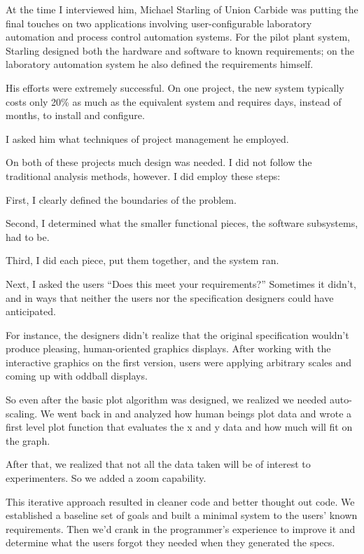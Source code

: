 \begin{interview}
\noindent At the time I interviewed him, Michael Starling of Union
Carbide was putting the final touches on two applications involving
user-configurable laboratory automation and process control automation
systems. For the pilot plant system, Starling designed both the
hardware and software to known requirements; on the laboratory
automation system he also defined the requirements himself.

His efforts were extremely successful. On one project, the new system
typically costs only 20\% as much as the equivalent system and
requires days, instead of months, to install and configure.

I asked him what techniques of project management he employed.

\begin{tfquot}
On both of these projects much design was needed. I did not follow the
traditional analysis methods, however. I did employ these steps:

First, I clearly defined the boundaries of the problem.

Second, I determined what the smaller functional pieces, the software
subsystems, had to be.

Third, I did each piece, put them together, and the system ran.

Next, I asked the users ``Does this meet your requirements?''
Sometimes it didn't, and in ways that neither the users nor the
specification designers could have anticipated.

For instance, the designers didn't realize that the original
specification wouldn't produce pleasing, human-oriented graphics
displays. After working with the interactive graphics on the first
version, users were applying arbitrary scales and coming up with
oddball displays.

So even after the basic plot algorithm was designed, we realized we
needed auto-scaling. We went back in and analyzed how human beings
plot data and wrote a first level plot function that evaluates the x
and y data and how much will fit on the graph.

After that, we realized that not all the data taken will be of
interest to experimenters. So we added a zoom capability.

This iterative approach resulted in cleaner code and better thought
out code. We established a baseline set of goals and built a minimal
system to the users' known requirements. Then we'd crank in the
programmer's experience to improve it and determine what the users
forgot they needed when they generated the specs.


\end{tfquot}
\end{interview}
